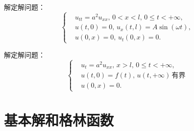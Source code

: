 \begin{problembox}
    \begin{exercise}
        解定解问题：
        \begin{equation*}
            \left\{
                \begin{aligned}
                    &u_{tt} = a^2 u_{xx},\, 0 < x < l,\, 0 \leq t < +\infty,\\
                    &u(t, 0) = 0,\, u_x(t, l) = A \sin(\omega t),\\
                    &u(0, x) = 0,\, u_t\left(0, x\right) = 0.
                \end{aligned}
            \right.
        \end{equation*}
    \end{exercise}
    \begin{exercise}
        解定解问题：
        \begin{equation*}
            \left\{
                \begin{aligned}
                    &u_{t} = a^2 u_{xx},\, x > l,\, 0 \leq t < +\infty,\\
                    &u(t, 0) = f(t),\, u(t, +\infty)\,\text{有界}\\
                    &u(0, x) = 0.
                \end{aligned}
            \right.
        \end{equation*}
    \end{exercise}
\end{problembox}

\section{基本解和格林函数}
